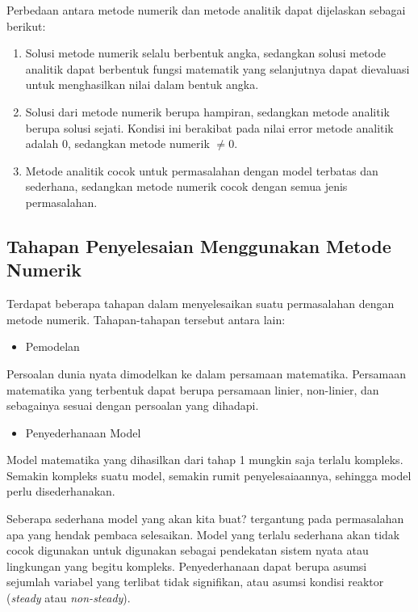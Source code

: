 \documentclass[
]{book}
\providecommand{\tightlist}{%
  \setlength{\itemsep}{0pt}\setlength{\parskip}{0pt}}
\theoremstyle{definition}
\theoremstyle{definition}
\theoremstyle{definition}
\theoremstyle{definition}
\theoremstyle{remark}
\begin{document}
Perbedaan antara metode numerik dan metode analitik dapat dijelaskan sebagai berikut:

\begin{enumerate}
\def\labelenumi{\arabic{enumi}.}
\item
  Solusi metode numerik selalu berbentuk angka, sedangkan solusi metode analitik dapat berbentuk fungsi matematik yang selanjutnya dapat dievaluasi untuk menghasilkan nilai dalam bentuk angka.
\item
  Solusi dari metode numerik berupa hampiran, sedangkan metode analitik berupa solusi sejati. Kondisi ini berakibat pada nilai error metode analitik adalah 0, sedangkan metode numerik \(\neq 0\).
\item
  Metode analitik cocok untuk permasalahan dengan model terbatas dan sederhana, sedangkan metode numerik cocok dengan semua jenis permasalahan.
\end{enumerate}

\hypertarget{tahapan-penyelesaian-menggunakan-metode-numerik}{%
\subsection{Tahapan Penyelesaian Menggunakan Metode Numerik}\label{tahapan-penyelesaian-menggunakan-metode-numerik}}

Terdapat beberapa tahapan dalam menyelesaikan suatu permasalahan dengan metode numerik. Tahapan-tahapan tersebut antara lain:

\begin{itemize}
\tightlist
\item
  Pemodelan
\end{itemize}

Persoalan dunia nyata dimodelkan ke dalam persamaan matematika. Persamaan matematika yang terbentuk dapat berupa persamaan linier, non-linier, dan sebagainya sesuai dengan persoalan yang dihadapi.

\begin{itemize}
\tightlist
\item
  Penyederhanaan Model
\end{itemize}

Model matematika yang dihasilkan dari tahap 1 mungkin saja terlalu kompleks. Semakin kompleks suatu model, semakin rumit penyelesaiaannya, sehingga model perlu disederhanakan.

Seberapa sederhana model yang akan kita buat? tergantung pada permasalahan apa yang hendak pembaca selesaikan. Model yang terlalu sederhana akan tidak cocok digunakan untuk digunakan sebagai pendekatan sistem nyata atau lingkungan yang begitu kompleks. Penyederhanaan dapat berupa asumsi sejumlah variabel yang terlibat tidak signifikan, atau asumsi kondisi reaktor (\emph{steady} atau \emph{non-steady}).
\end{document}
